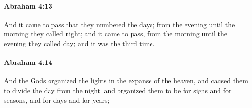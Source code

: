 		\paragraph{Abraham 4:13} %
			\label{ABRAHAM-4-13}

			And it came to pass that they numbered the days; from the evening until the morning they called night; and it came to pass, from the morning until the evening they called day; and it was the third time.


		\paragraph{Abraham 4:14} %
			\label{ABRAHAM-4-14}

			And the Gods organized the lights in the expanse of the heaven, and caused them to divide the day from the night; and organized them to be for signs and for seasons, and for days and for years;


